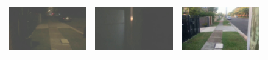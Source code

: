 \documentclass[letterpaper, 10 pt, conference]{ieeeconf}  %
\begin{document}
\begin{figure}[htbp]
\centering
\begin{tabular}{ccc}

 \includegraphics[width=\imgW,height=\imgH]{rio-q1-2} &
 \includegraphics[width=\imgW,height=\imgH]{rio-rf1-2} &
 \includegraphics[width=\imgW,height=\imgH]{rio-r1} \\
 

\end{tabular}
\end{figure}
\end{document}
